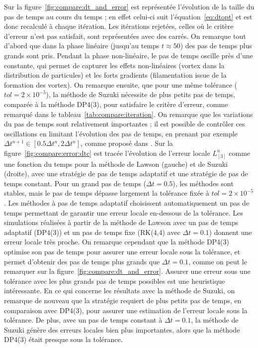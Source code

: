 Sur la figure~\ref{fig:compare:dt_and_error} est représentée l'évolution de la taille du pas de temps au cours du temps ; en effet celui-ci suit l'équation~\eqref{eq:dtopt} et est donc recalculé à chaque itération. Les itérations rejetées, celles où le critère d'erreur n'est pas satisfait, sont représentées avec des carrés. On remarque tout d'abord que dans la phase linéaire (jusqu'au temps $t\approx 50$) des pas de temps plus grands sont pris. Pendant la phase non-linéaire, le pas de temps oscille près d'une constante, qui permet de capturer les effets non-linéaires (vortex dans la distribution de particules) et les forts gradients (filamentation issue de la formation des vortex). On remarque ensuite, que pour une même tolérance ($tol=2\times10^{-5}$), la méthode de Suzuki nécessite de plus petits pas de temps, comparée à la méthode DP4(3), pour satisfaire le critère d'erreur, comme remarqué dans le tableau~\ref{tab:compare:iteration}. On remarque que les variations du pas de temps sont relativement importantes ; il est possible de contrôler ces oscillations en limitant l'évolution des pas de temps, en prenant par exemple $\Delta t^{n+1}\in[0.5\Delta t^n,2\Delta t^n]$, comme proposé dans \cite{Balac:2014}. Sur la figure~\ref{fig:compare:error:dtc} est tracée l'évolution de l'erreur locale $L_{[3]}^n$ comme une fonction du temps pour la méthode de Lawson (gauche) et de Suzuki (droite), avec une stratégie de pas de temps adaptatif et une stratégie de pas de temps constant. Pour un grand pas de temps ($\Delta t = 0.5$), les méthodes sont stables, mais le pas de temps dépasse largement la tolérance fixée à $tol=2\times10^{-5}$. Les méthodes à pas de temps adaptatif choisissent automatiquement un pas de temps permettant de garantir une erreur locale en-dessous de la tolérance.
Les simulations réalisées à partir de la méthode de Lawson avec un pas de temps adaptatif (DP4(3)) et un pas de temps fixe (RK(4,4) avec $\Delta t = 0.1$) donnent une erreur locale très proche. On remarque cependant que la méthode DP4(3) optimise son pas de temps pour assurer une erreur locale sous la tolérance, et permet d'obtenir des pas de temps plus grands que $\Delta t =0.1$, comme on peut le remarquer sur la figure~\ref{fig:compare:dt_and_error}. Assurer une erreur sous une tolérance avec les plus grands pas de temps possibles est une heuristique intéressante. En ce qui concerne les résultats avec la méthode de Suzuki, on remarque de nouveau que la stratégie requiert de plus petits pas de temps, en comparaison avec DP4(3), pour assurer une estimation de l'erreur locale sous la tolérance. De plus, avec un pas de temps constant à $\Delta t = 0.1$, la méthode de Suzuki génère des erreurs locales bien plus importantes, alors que la méthode DP4(3) était presque sous la tolérance.

